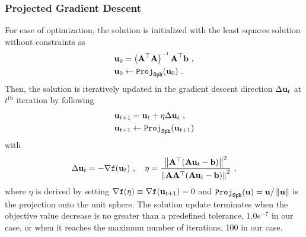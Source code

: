 \subsubsection{Projected Gradient Descent}
For ease of optimization, the solution is initialized with the least squares solution without constraints as
\begin{align}
\mb{u}_0 &= \left( \mb{A}^\top\mb{A} \right)\inv \mb{A}^\top \mb{b}\ , \label{eq:origin} \\
\mb{u}_{0} &\leftarrow \texttt{Proj}_\texttt{Sph}(\mb{u}_{0})\ .
\end{align}
%
Then, the solution is iteratively updated in the gradient descent direction $\Delta \mathbf{u}_t$ at $t^{\text{th}}$ iteration by following
%
\begin{align}
\mathbf{u}_{t+1} &= \mathbf{u}_t +\eta \Delta \mathbf{u}_t\ , \\
\mathbf{u}_{t+1} &\leftarrow \texttt{Proj}_{\texttt{Sph}}(\mathbf{u}_{t+1})
\end{align}
%
with
%
\begin{align}
\Delta \mb{u}_t = -\nabla \texttt{f}(\mb{u}_t)\ ,
\quad
\eta = \frac{\norm{\mb{A}^\top (\mb{A}\mb{u}_t-\mb{b})}^2}{\norm{\mb{A}\mb{A}^\top(\mb{A}\mb{u}_t-\mb{b})}^2}\ ,
\end{align}
%
where $\eta$ is derived by setting $\nabla \texttt{f}(\eta) \equiv \nabla \texttt{f}(\mathbf{u}_{t+1})=0$ and $\texttt{Proj}_{\texttt{Sph}}(\mathbf{u})=\mathbf{u}/\left\lVert\mathbf{u}\right\rVert$ is the projection onto the unit sphere.
The solution update terminates when the objective value decrease is no greater than a predefined tolerance, $1.0e^{-7}$ in our case, or when it reaches the maximum number of iterations, 100 in our case.

